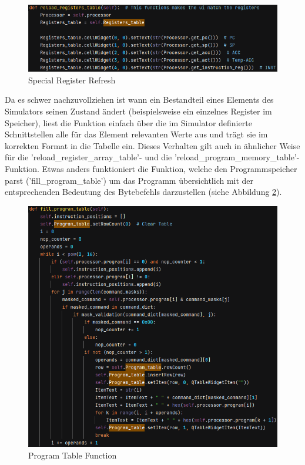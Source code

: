 \documentclass[12pt]{article}
\newcommand{\imgSpaceBefore}{\vspace{10pt}}
\begin{document}
\begin{figure}[H]
\centering
\includegraphics[width=14cm]{bilder/reloadRegs}
\caption{Special Register Refresh}
\label{fig:reloadRegs}
\end{figure}

\noindent
Da es schwer nachzuvollziehen ist wann ein Bestandteil eines Elements des Simulators seinen Zustand ändert (beispielsweise ein einzelnes Register im Speicher), liest die Funktion einfach über die im Simulator definierte Schnittstellen alle für das Element relevanten Werte aus und trägt sie im korrekten Format in die Tabelle ein. Dieses Verhalten gilt auch in ähnlicher Weise für die 'reload\_register\_array\_table'- und die 'reload\_program\_memory\_table'-Funktion. Etwas anders funktioniert die Funktion, welche den Programmspeicher parst ('fill\_program\_table') um das Programm übersichtlich mit der entsprechenden Bedeutung des Bytebefehls darzustellen (siehe Abbildung \ref{fig:FillProgReg}).\imgSpaceBefore

\begin{figure}[H]
\centering
\includegraphics[width=14cm]{bilder/FillProgTable}
\caption{Program Table Function}
\label{fig:FillProgReg}
\end{figure}
\end{document}

